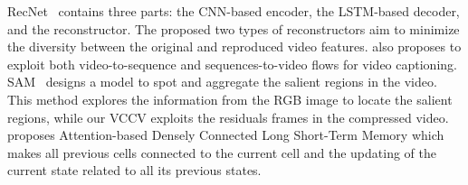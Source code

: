 \documentclass[a4paper,conference]{IEEEtran}
\begin{document}
RecNet~\cite{wang2018reconstruction} contains three parts: the CNN-based encoder, the LSTM-based decoder, and the reconstructor. The proposed two types of reconstructors aim to minimize the diversity between the original and reproduced video features.  \cite{wang2018reconstruction} also proposes to exploit both video-to-sequence and sequences-to-video flows for video captioning. SAM~\cite{wang2018spotting} designs a model to spot and aggregate the salient regions in the video. This method explores the information from the RGB image to locate the salient regions, while our VCCV exploits the residuals frames in the compressed video.~\cite{zhu2019attention} proposes Attention-based Densely Connected Long Short-Term Memory which makes all previous cells connected to the current cell and the updating of the current state related to all its previous states.%
\end{document}
